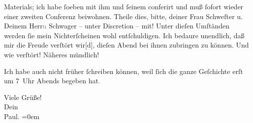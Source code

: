               Materials; ich habe{ }ſoeben mit ihm und{ }ſeinem \label{K_L02652-2v}\label{K_L02652-2} conferirt und
               muß{ }ſofort wieder einer zweiten Conferenz beiwohnen. Theile dies, bitte, deiner Frau
                  Schweſter u. Deinem
                  Herr\textcolor{gray}{n}{ }Schwager – unter Discretion –
               mit! Unter dieſen Umſtänden {\pb}werden{ }ſie mein
               Nichterſcheinen wohl entſchuldigen. Ich bedaure unendlich, daß mir die Freude
               verſtört wir{[}d{]}, dieſen Abend bei ihnen zubringen zu können. Und
               wie verſtört! Näheres mündlich!\pend
           
\pstart
           Ich habe auch nicht früher{ }ſchreiben können, weil{ }ſich die ganze Geſchichte erſt um
                  7 Uhr Abends begeben hat\textcolor{gray}{.}\pend
           
\pstart
           Viele Grüße!{\\[\baselineskip]}Dein{\\[\baselineskip]}\spacefill\mbox{Paul.}\pend
           \leftskip=0em{}\endnumbering{}  \newcommand{\dateiname}{L02652}\newcommand{\titel}{Paul Goldmann an Arthur Schnitzler, 20. 12. 1890}\newcommand{\editorInnen}{Martin Anton Müller und Laura Untner}
